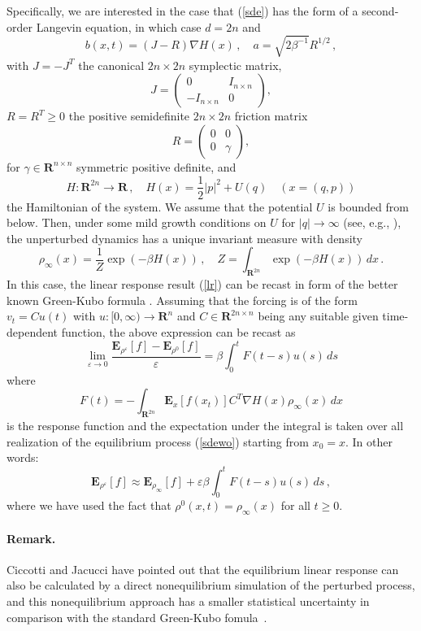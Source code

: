 \documentclass[]{tMPH2e}
\newcommand{\R}{{\mathbf R}}
\newcommand{\eps}{\varepsilon}
\newcommand{\bE}{{\mathbf E}}
\begin{document}
Specifically, we are interested in the case that (\ref{sde}) has the form of a second-order Langevin equation, in which case $d=2n$ and 
\begin{equation}\label{eqn:langevin-1}
b(x,t) = (J-R)\nabla H(x)\,,\quad a = \sqrt{2\beta^{-1}}R^{1/2}\,,
\end{equation}
with $J=-J^{T}$ the canonical $2n\times 2n$ symplectic matrix,
\[
J = \left ( \begin{array}{cc} 
0 & I_{n\times n} \\ -I_{n\times n} &0
\end{array}\right),
\]
$R=R^{T}\ge 0$ the positive semidefinite $2n\times 2n$ friction matrix 
\[
R = \left ( \begin{array}{cc}
0 & 0 \\ 0 & \gamma
\end{array}\right),
\]
for $\gamma\in\R^{n\times n}$ symmetric positive definite, and 
\[
H\colon\R^{2n}\to\R\,,\quad H(x) = \frac{1}{2}|p|^{2} + U(q) \quad (x=(q,p))
\] 
the Hamiltonian of the system. We assume that the potential $U$ is bounded from below. Then, under some mild growth conditions on $U$ for $|q|\to\infty$ (see, e.g., \cite{mattingly2002}), the unperturbed dynamics has a unique invariant measure with density 
\[
\rho_{\infty}(x) = \frac{1}{Z}\exp(-\beta H(x))\,,\quad  Z=\int_{\R^{2n}}  \exp(-\beta H(x))\,dx\,.
\] 
In this case, the linear response result (\ref{lr}) can be recast in form of the better known Green-Kubo formula \cite{risken1996}. Assuming that the forcing is of the form $v_{t}=Cu(t)$ with $u\colon[0,\infty)\to\R^{n}$ and $C\in\R^{2n\times n}$ being any suitable given time-dependent function, the above expression can be recast as 
\begin{equation}\label{GreenKubo}
\lim_{\eps\to 0}\frac{\bE_{\rho^{\eps}}[f] - \bE_{\rho^{0}}[f]}{\eps} = \beta\int_{0}^{t}F(t-s)u(s)\,ds
\end{equation}
where 
\[
F(t) = - \int_{\R^{2n}}\bE_{x}[f(x_{t})] C^{T}\nabla H(x)\rho_{\infty}(x)\,dx
\]
is the response function and the expectation under the integral is taken over all realization of the equilibrium process (\ref{sdewo}) starting from $x_{0}=x$. In other words: 
\[
\bE_{\rho^{\eps}}[f] \approx \bE_{\rho_{\infty}}[f] + \eps\beta\int_{0}^{t}F(t-s)u(s)\,ds\,,
\]
where we have used the fact that $\rho^{0}(x,t)= \rho_{\infty}(x)$ for
all $t\ge 0$.

\paragraph*{Remark.}
{Ciccotti and Jacucci have pointed out that
  the equilibrium linear response
can also be calculated by a direct nonequilibrium simulation of the
perturbed process, and  this nonequilibrium
approach has a smaller statistical uncertainty in comparison with the
standard Green-Kubo fomula~\cite{ciccotti1975direct}.
}
\end{document}
